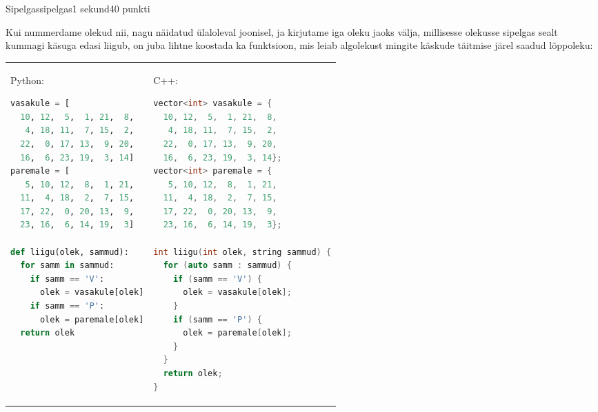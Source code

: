 \begin{yl}{4}{Sipelgas}{sipelgas}{1 sekund}{40 punkti}
\begin{center}
\end{center}

Kui nummerdame olekud nii, nagu näidatud ülaloleval joonisel, ja kirjutame iga oleku jaoks välja, millisesse olekusse sipelgas sealt kummagi käsuga edasi liigub, on juba lihtne koostada ka funktsioon, mis leiab algolekust mingite käskude täitmise järel saadud lõppoleku:

\begin{tabular}{p{\colwidth} p{\colwidth}}
Python:
\begin{lstlisting}[language=Python]
vasakule = [
  10, 12,  5,  1, 21,  8,
   4, 18, 11,  7, 15,  2,
  22,  0, 17, 13,  9, 20,
  16,  6, 23, 19,  3, 14]
paremale = [
   5, 10, 12,  8,  1, 21,
  11,  4, 18,  2,  7, 15,
  17, 22,  0, 20, 13,  9,
  23, 16,  6, 14, 19,  3]

def liigu(olek, sammud):
  for samm in sammud:
    if samm == 'V':
      olek = vasakule[olek]
    if samm == 'P':
      olek = paremale[olek]
  return olek
\end{lstlisting}
&
C++:
\begin{lstlisting}[language=C++]
vector<int> vasakule = {
  10, 12,  5,  1, 21,  8,
   4, 18, 11,  7, 15,  2,
  22,  0, 17, 13,  9, 20,
  16,  6, 23, 19,  3, 14};
vector<int> paremale = {
   5, 10, 12,  8,  1, 21,
  11,  4, 18,  2,  7, 15,
  17, 22,  0, 20, 13,  9,
  23, 16,  6, 14, 19,  3};

int liigu(int olek, string sammud) {
  for (auto samm : sammud) {
    if (samm == 'V') {
      olek = vasakule[olek];
    }
    if (samm == 'P') {
      olek = paremale[olek];
    }
  }
  return olek;
}
\end{lstlisting}
\end{tabular}


\end{yl}
